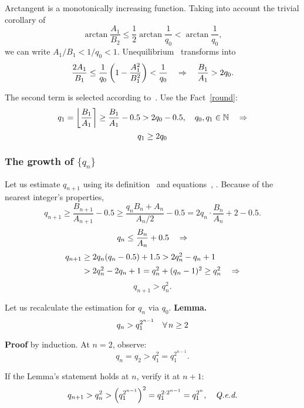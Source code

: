 \documentclass[draft, 10pt]{article} %
\def\fact#1{Fact~\ref{#1}}
\begin{document}
Arctangent is a monotonically increasing function.
Taking into account the trivial corollary of~
$$
\arctan \dfrac{A_1}{B_2} \le \dfrac{1}{2} \arctan \dfrac{1}{q_0} < \arctan \dfrac{1}{q_0},
$$
we can write $A_1/B_1 < 1/q_0 < 1$. Unequilibrium~ transforms into
%
\begin{equation}\mlabel{first-remainder-frac}
\dfrac{2A_1}{B_1} \le \dfrac{1}{q_0} \left( 1 - \dfrac{A_1^2}{B_1^2} \right) < \dfrac{1}{q_0}
    \quad\ergo\quad \dfrac{B_1}{A_1} > 2 q_0.
\end{equation}

The second term is selected according to~. Use the \fact{round}:
$$
q_1 = \nround{ \dfrac{B_1}{A_1} } \ge \dfrac{B_1}{A_1} - 0.5 > 2 q_0 - 0.5,
    \quad q_0, q_1 \in \N \quad\ergo
$$
\begin{equation}\mlabel{second-term-double}
q_1 \ge 2 q_0
\end{equation}

\subsubsection{The growth of $\{ q_n \}$}

Let us estimate $q_{n+1}$ using its definition~ and equations~,
. Because of the nearest integer's properties,
$$
q_{n+1} \ge \dfrac{B_{n+1}}{A_{n+1}} - 0.5 \ge \dfrac{q_n B_n + A_n}{A_n / 2} - 0.5
    = 2 q_n \cdot \dfrac{B_n}{A_n} + 2 - 0.5.
$$
$$
q_n \le \dfrac{B_n}{A_n} + 0.5 \quad\ergo
$$
$$
\begin{array}{l}
q_{n+1} \ge 2 q_n ( q_n - 0.5 ) + 1.5 > 2 q_n^2 - q_n + 1 \\[0.5em]
\phantom{q_{n+1}} > 2 q_n^2 - 2 q_n + 1 = q_n^2 + (q_n - 1)^2 \ge q_n^2 \quad\ergo
\end{array}
$$
$$
q_{n+1} > q_n^2.
$$

Let us recalculate the estimation for $q_n$ via $q_0$.
{\bf Lemma.\/}
%
\begin{equation}\mlabel{estimate-qn1}
q_n > q_1 ^ {2^{n-1}} \quad \forall\, n \ge 2
\end{equation}

{\bf Proof\/} by induction. At $n=2$, observe:
$$
q_n = q_2 > q_1^2 = q_1^{2^{n-1}}.
$$

If the Lemma's statement holds at $n$, verify it at $n+1$:
$$
q_{n+1} > q_n^2 >\left( q_1^{2^{n-1}} \right)^2 = q_1^{2 \cdot 2^{n-1}} = q_1^{2^n},
    \quad\hbox{\qed}
$$
\end{document}
